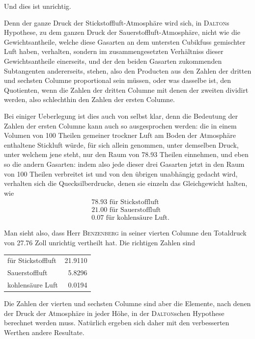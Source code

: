 \documentclass[12pt,a4paper]{article}
\begin{document}
Und dies ist unrichtig.

Denn der ganze Druck der Stickstoffluft-Atmosph\"are wird sich, in \textsc{Dalton}s Hypothese, zu dem ganzen Druck der Sauerstoffluft-Atmosph\"are, nicht wie die Gewichtsantheile, welche diese Gasarten an dem untersten Cubikfuss gemischter Luft haben, verhalten, sondern im zusammengesetzten Verh\"altniss dieser Gewichtsantheile einerseits, und der den beiden Gasarten zukommenden Subtangenten andererseits, stehen, also den Producten aus den Zahlen der dritten und sechsten Columne proportional sein m\"ussen, oder was dasselbe ist, den Quotienten, wenn die Zahlen der dritten Columne mit denen der zweiten dividirt werden, also schlechthin den Zahlen der ersten Columne.

Bei einiger Ueberlegung ist dies auch von selbst klar, denn die Bedeutung der Zahlen der ersten Columne kann auch so ausgesprochen werden: die in einem Volumen von 100 Theilen gemeiner trockner Luft am Boden der Atmosph\"are enthaltene Stickluft w\"urde, f\"ur sich allein genommen, unter demselben Druck, unter welchem jene steht, nur den Raum von 78.93 Theilen einnehmen, und eben so die andern Gasarten: indem also jede dieser drei Gasarten jetzt in den Raum von 100 Theilen verbreitet ist und von den \"ubrigen unabh\"angig gedacht wird, verhalten sich die Quecksilberdrucke, denen sie einzeln das Gleichgewicht halten, wie
\begin{align*}
&78.93 \text{ f\"ur Stickstoffluft} \\
&21.00 \text{ f\"ur Sauerstoffluft} \\
&0.07 \text{ f\"ur kohlens\"aure Luft}.
\end{align*}

\newpage
\noindent
Man sieht also, dass Herr \textsc{Benzenberg} in seiner vierten Columne den Totaldruck von 27.76 Zoll unrichtig vertheilt hat. Die richtigen Zahlen sind
\begin{center}
\begin{tabular}{l@{\ \ldots\ldots\ }r@{\ Zoll}}
f\"ur Stickstoffluft & 21.9110 \\
\quad\quad Sauerstoffluft & 5.8296 \\
\quad\quad kohlens\"aure Luft & 0.0194 \\
\end{tabular}
\end{center}

\smallskip
\noindent
Die Zahlen der vierten und sechsten Columne sind aber die Elemente, nach denen der Druck der Atmosph\"are in jeder H\"ohe, in der \textsc{Dalton}schen Hypothese berechnet werden muss. Nat\"urlich ergeben sich daher mit den verbesserten Werthen andere Resultate.
\end{document}
